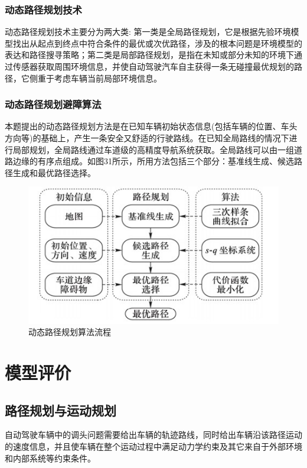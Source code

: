\documentclass{article}
\begin{document}
\subsubsection{动态路径规划技术}
动态路径规划技术主要分为两大类: 第一类是全局路径规划，它是根据先验环境模型找出从起点到终点中符合条件的最优或次优路径，涉及的根本问题是环境模型的表达和路径搜寻策略；第二类是局部路径规划，是指在未知或部分未知的环境下通过传感器获取周围环境信息，并使自动驾驶汽车自主获得一条无碰撞最优规划的路径，它侧重于考虑车辆当前局部环境信息。\cite{王富奎2018高动态环境下智能车局部路径规划研究} 

\subsubsection{动态路径规划避障算法}
本题提出的动态路径规划方法是在已知车辆初始状态信息(包括车辆的位置、车头方向等)的基础上，产生一条安全又舒适的行驶路线。在已知全局路线的情况下进行局部规划，全局路线通过车道级的高精度导航系统获取。全局路线可以由一组道路边缘的有序点组成。如图31所示，所用方法包括三个部分：基准线生成、候选路径生成和最优路径选择。

\begin{figure}[H]
    \centering
    \includegraphics[scale=0.8]{31.jpg}
    \caption{动态路径规划算法流程}
\end{figure}

\newpage
\section{模型评价}
\subsection{路径规划与运动规划}
自动驾驶车辆中的调头问题需要给出车辆的轨迹路线，同时给出车辆沿该路径运动的速度信息，并且使车辆在整个运动过程中满足动力学约束及其它来自于外部环境和内部系统等约束条件。\cite{li2017nonlinear}
\end{document}
